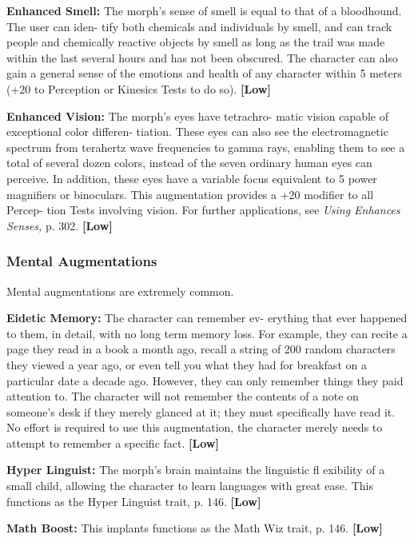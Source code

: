 \textbf{Enhanced Smell:} The morph's sense of smell is 
equal to that of a bloodhound. The user can iden-
tify both chemicals and individuals by smell, and can 
track people and chemically reactive objects by smell 
as long as the trail was made within the last several 
hours and has not been obscured. The character can 
also gain a general sense of the emotions and health 
of any character within 5 meters (+20 to Perception or 
Kinesics Tests to do so). \textbf{[Low]}

\textbf{Enhanced Vision:} The morph's eyes have tetrachro-
matic vision capable of exceptional color differen-
tiation. These eyes can also see the electromagnetic 
spectrum from terahertz wave frequencies to gamma 
rays, enabling them to see a total of several dozen 
colors, instead of the seven ordinary human eyes can 
perceive. In addition, these eyes have a variable focus 
equivalent to 5 power magnifiers or binoculars. This 
augmentation provides a +20 modifier to all Percep-
tion Tests involving vision. For further applications, 
see \textit{Using Enhances Senses,} p. 302. \textbf{[Low]}

\subsubsection{Mental Augmentations}

Mental augmentations are extremely common.

\textbf{Eidetic Memory:} The character can remember ev-
erything that ever happened to them, in detail, with 
no long term memory loss. For example, they can 
recite a page they read in a book a month ago, recall 
a string of 200 random characters they viewed a year 
ago, or even tell you what they had for breakfast on 
a particular date a decade ago. However, they can 
only remember things they paid attention to. The 
character will not remember the contents of a note 
on someone's desk if they merely glanced at it; they 
must specifically have read it. No effort is required to 
use this augmentation, the character merely needs to 
attempt to remember a specific fact. \textbf{[Low]}

\textbf{Hyper Linguist: }The morph's brain maintains the 
linguistic fl exibility of a small child, allowing the 
character to learn languages with great ease. This 
functions as the Hyper Linguist trait, p. 146. \textbf{[Low]}

\textbf{Math Boost:} This implants functions as the Math 
Wiz trait, p. 146. \textbf{[Low]}

